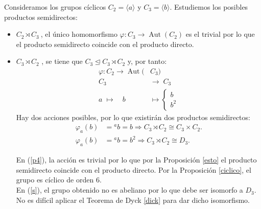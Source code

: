 \begin{Ejemplo} \label{c3c2}
Consideramos los grupos cíclicos $C_2=\langle a\rangle $ y $C_3=\langle b\rangle$. Estudiemos los posibles productos semidirectos:
\begin{itemize}
    \setlength\itemsep{0.34em}

        \item $C_2 \rtimes C_3 \:$, el único homomorfismo $\varphi \colon C_3 \rightarrow \operatorname{Aut}(C_2)$ es el trivial por lo que el producto semidirecto coincide con el producto directo.

    \item $C_3 \rtimes C_2$ \! \!, se tiene que $C_3 \trianglelefteq C_3 \rtimes C_2$ y, por tanto:
    \begin{align*}
        \varphi \colon C_2 \longrightarrow \operatorname{Aut}(&C_3) \\
         C_3 &\longrightarrow  \; C_3  \\
         a   \;  \longmapsto  \quad  b  \; \; &\longmapsto  
        \begin{cases}
              b  \\
              b^2  
        \end{cases}
    \end{align*}
    Hay dos acciones posibles, por lo que existirán dos productos semidirectos:
    \begin{align}
        \varphi_a(b) &= {}^ab = b  \Longrightarrow C_3 \rtimes C_2 \cong C_3 \times C_2. \label{p4}\\
        \varphi_a(b) &= {}^ab = b^2  \Longrightarrow C_3 \rtimes C_2 \cong D_3 . \label{s}
    \end{align}
    
    En (\ref{p4}), la acción es trivial por lo que por la Proposición \ref{esto} el producto semidirecto coincide con el producto directo. Por la Proposición \ref{ciclico}, el grupo es cíclico de orden $6$. \\
    En (\ref{s}), el grupo obtenido no es abeliano por lo que debe ser isomorfo a $D_3$. No es difícil aplicar el Teorema de Dyck \ref{dick} para dar dicho isomorfismo.
    
    
\end{itemize}


\end{Ejemplo}






